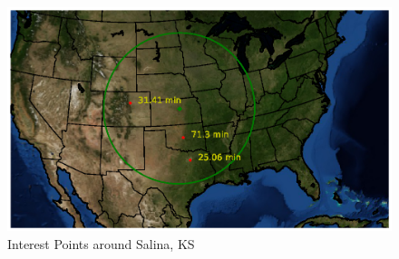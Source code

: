 \begin{figure}
    \centering
    \includegraphics[width = \textwidth]{Thesis/Method/IntPtsFigure.eps}
    \caption{Interest Points around Salina, KS}
    \label{fig:intPtsMap}
\end{figure}
